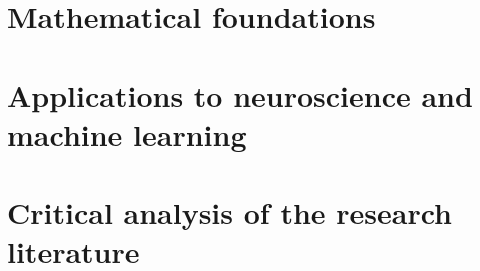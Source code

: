 \documentclass[11pt,oneside,openany]{book}
\begin{document}
\frontmatter

\tableofcontents
\listoffigures
\mainmatter
\part{Mathematical foundations}





\part{Applications to neuroscience and machine learning}






\part{Critical analysis of the research literature}


\appendix





\backmatter
\cleardoublepage
{}
{}


\end{document}
